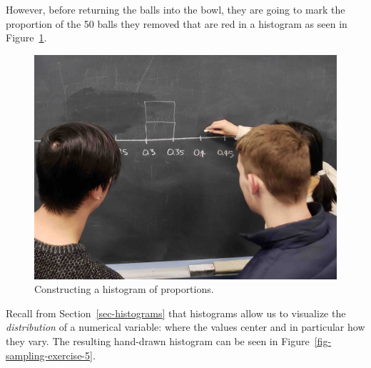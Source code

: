 \documentclass[
  letterpaper,
  DIV=11,
  numbers=noendperiod]{scrreprt}
\theoremstyle{definition}
\theoremstyle{remark}
\begin{document}
\begin{longtable}[]
\end{longtable}

However, before returning the balls into the bowl, they are going to
mark the proportion of the 50 balls they removed that are red in a
histogram as seen in Figure~\ref{fig-sampling-exercise-4}.

\begin{figure}

{\centering \includegraphics{images/sampling/tactile_3_a.jpg}

}

\caption{\label{fig-sampling-exercise-4}Constructing a histogram of
proportions.}

\end{figure}

Recall from Section~\ref{sec-histograms} that histograms allow us to
visualize the \emph{distribution} of a numerical variable: where the
values center and in particular how they vary. The resulting hand-drawn
histogram can be seen in Figure~\ref{fig-sampling-exercise-5}.
\end{document}
